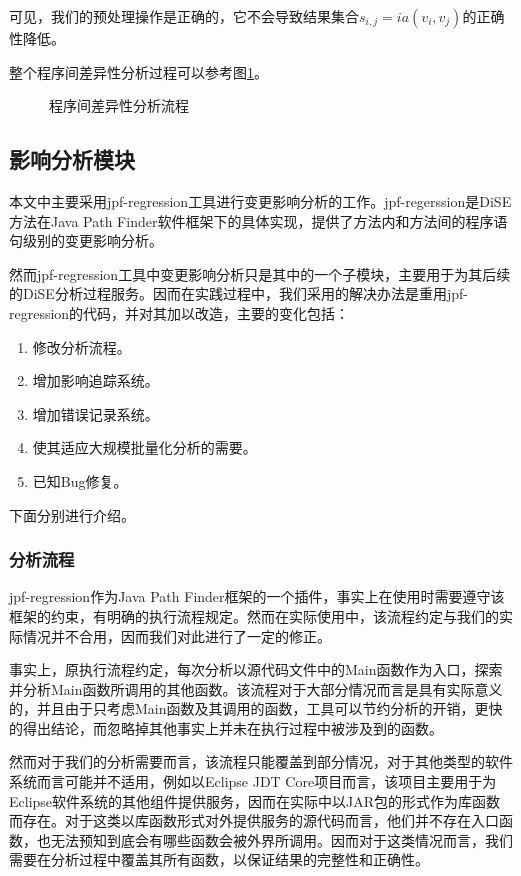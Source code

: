 可见，我们的预处理操作是正确的，它不会导致结果集合$s_{i,j} = ia(v_i,v_j)$的正确性降低。

整个程序间差异性分析过程可以参考图\ref {diff}。

\begin{figure}[H]
	\centering
	\caption {程序间差异性分析流程}
	\label {diff}	
\end{figure}

\subsection{影响分析模块}

本文中主要采用jpf-regression工具进行变更影响分析的工作。jpf-regerssion是DiSE方法在Java Path Finder软件框架下的具体实现，提供了方法内和方法间的程序语句级别的变更影响分析。

然而jpf-regression工具中变更影响分析只是其中的一个子模块，主要用于为其后续的DiSE分析过程服务。因而在实践过程中，我们采用的解决办法是重用jpf-regression的代码，并对其加以改造，主要的变化包括：
\begin{enumerate}
	\item 修改分析流程。
	\item 增加影响追踪系统。
	\item 增加错误记录系统。
	\item 使其适应大规模批量化分析的需要。
	\item 已知Bug修复。
\end{enumerate}

下面分别进行介绍。

\subsubsection{分析流程}
jpf-regression作为Java Path Finder框架的一个插件，事实上在使用时需要遵守该框架的约束，有明确的执行流程规定。然而在实际使用中，该流程约定与我们的实际情况并不合用，因而我们对此进行了一定的修正。

事实上，原执行流程约定，每次分析以源代码文件中的Main函数作为入口，探索并分析Main函数所调用的其他函数。该流程对于大部分情况而言是具有实际意义的，并且由于只考虑Main函数及其调用的函数，工具可以节约分析的开销，更快的得出结论，而忽略掉其他事实上并未在执行过程中被涉及到的函数。

然而对于我们的分析需要而言，该流程只能覆盖到部分情况，对于其他类型的软件系统而言可能并不适用，例如以Eclipse JDT Core项目而言，该项目主要用于为Eclipse软件系统的其他组件提供服务，因而在实际中以JAR包的形式作为库函数而存在。对于这类以库函数形式对外提供服务的源代码而言，他们并不存在入口函数，也无法预知到底会有哪些函数会被外界所调用。因而对于这类情况而言，我们需要在分析过程中覆盖其所有函数，以保证结果的完整性和正确性。


